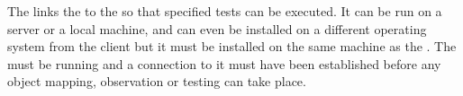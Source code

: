 The \gdserver links the \gdaut to the \gdclient so that specified 
tests can be executed. 
It can be run on a server or a local machine, and can even be installed on 
a different operating system from the client
but it must be installed on the 
same machine as the \gdaut{}. The \gdserver must be
 running and a connection to it
must have been established before any object mapping, observation or testing 
can take place.















